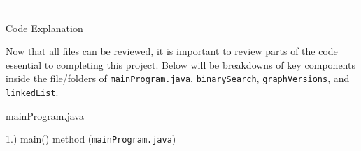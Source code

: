 \documentclass{article}
\begin{document}
\begin{center}
    -----------------------------------------------------------------------
\end{center}

\begin{center}
\begin{large}
    Code Explanation
\end{large}
\end{center}

Now that all files can be reviewed, it is important to review parts of the code essential to completing this project. Below will be breakdowns of key components inside the file/folders of \verb|mainProgram.java|, \verb|binarySearch|, \verb|graphVersions|, and \verb|linkedList|.

\pagebreak

\begin{center}
\begin{large}
    mainProgram.java
\end{large}
\end{center}
 
\begin{large}
    1.) main() method (\verb|mainProgram.java|)
\end{large}
\end{document}
